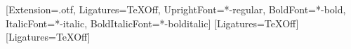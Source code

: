 
\usepackage{amsmath}
\usepackage{amsthm}
\usepackage{mathtools}

\usepackage{amssymb}
\usepackage{iftex}
\ifXeTeX
  \usepackage{newtxmath}
  \usepackage[no-math]{fontspec}
    {\setmainfont{texgyretermes}[Extension=.otf, Ligatures=TeXOff,
        UprightFont=*-regular, BoldFont=*-bold,
        ItalicFont=*-italic, BoldItalicFont=*-bolditalic]}
    {
      {\setmainfont{Times New Roman}[Ligatures=TeXOff]}
      {\setmainfont{Latin Modern Roman}[Ligatures=TeXOff]}}
  \providecommand{\symbf}[1]{\mathbf{#1}}
\else
  \usepackage[T2A,T1]{fontenc}       %
  \usepackage[utf8]{inputenc}
  \usepackage{newtxtext}             %
  \usepackage{newtxmath}             %
  \providecommand{\symbf}[1]{\mathbf{#1}}
\fi

